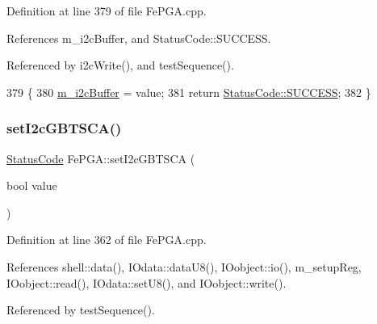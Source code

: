 Definition at line 379 of file Fe\+P\+G\+A.\+cpp.



References m\+\_\+i2c\+Buffer, and Status\+Code\+::\+S\+U\+C\+C\+E\+SS.



Referenced by i2c\+Write(), and test\+Sequence().


\begin{DoxyCode}
379                                                        \{
380   \hyperlink{classFePGA_a173664ffd6a73f454ae31f51e689dd16}{m\_i2cBuffer} = value;
381   \textcolor{keywordflow}{return} \hyperlink{classStatusCode_a6f565cbeadc76d14c72f047e5e85eb4badd0da38d3ba0d922efd1f4619bc37ad8}{StatusCode::SUCCESS};
382 \}
\end{DoxyCode}
\mbox{\label{classFePGA_ac9a16de5f01fda901494abe61efb5029}} 
\subsubsection{\texorpdfstring{set\+I2c\+G\+B\+T\+S\+C\+A()}{setI2cGBTSCA()}}
{\footnotesize\ttfamily \hyperlink{classStatusCode}{Status\+Code} Fe\+P\+G\+A\+::set\+I2c\+G\+B\+T\+S\+CA (\begin{DoxyParamCaption}\item[{bool}]{value }\end{DoxyParamCaption})}



Definition at line 362 of file Fe\+P\+G\+A.\+cpp.



References shell\+::data(), I\+Odata\+::data\+U8(), I\+Oobject\+::io(), m\+\_\+setup\+Reg, I\+Oobject\+::read(), I\+Odata\+::set\+U8(), and I\+Oobject\+::write().



Referenced by test\+Sequence().


